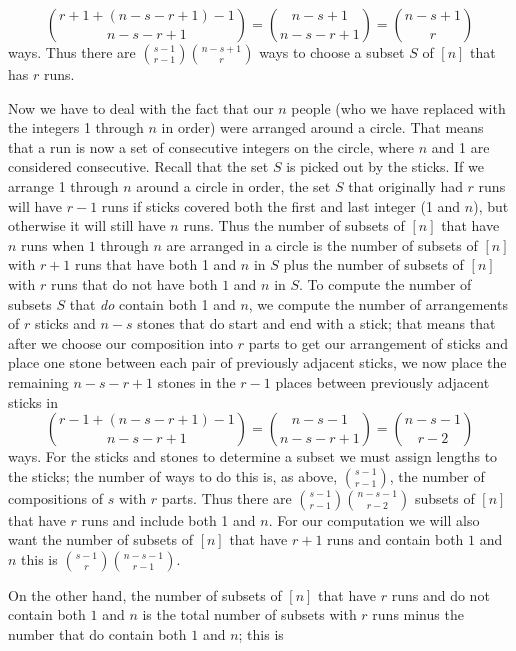 \documentclass[10pt,]{book}
\theoremstyle{plain}
\theoremstyle{definition}
\theoremstyle{definition}
\numberwithin{equation}{chapter}
\begin{document}
\begin{exerciselist}
\begin{equation*}
\binom{r+1 + (n-s-r+1)-1}{n-s-r+1}=\binom{n-s+1}{n-s-r+1}=\binom{n-s+1}{r}
\end{equation*}
ways. Thus there are \(\binom{s-1}{r-1}\binom{n-s+1}{r}\) ways to choose a subset \(S\) of \([n]\) that has \(r\) runs.%
\par
Now we have to deal with the fact that our \(n\) people (who we have replaced with the integers 1 through \(n\) in order) were arranged around a circle. That means that a run is now a set of consecutive integers on the circle, where \(n\) and 1 are considered consecutive. Recall that the set \(S\) is picked out by the sticks. If we arrange 1 through \(n\) around a circle in order, the set \(S\) that originally had \(r\) runs will have \(r-1\) runs if sticks covered both the first and last integer (1 and \(n\)), but otherwise it will still have \(n\) runs. Thus the number of subsets of \([n]\) that have \(n\) runs when \(1\) through \(n\) are arranged in a circle is the number of subsets of \([n]\) with \(r+1\) runs that have both 1 and \(n\) in \(S\) plus the number of subsets of \([n]\) with \(r\) runs that do not have both \(1\) and \(n\) in \(S\). To compute the number of subsets \(S\) that \emph{do} contain both 1 and \(n\), we compute the number of arrangements of \(r\) sticks and \(n-s\) stones that do start and end with a stick; that means that after we choose our composition into \(r\) parts to get our arrangement of sticks and place one stone between each pair of previously adjacent sticks, we now place the remaining \(n-s-r+1\) stones in the \(r-1\) places between previously adjacent sticks in%
\begin{equation*}
\binom{r-1 + (n-s-r+1)-1}{n-s-r+1}=\binom{n-s-1}{n-s-r+1}=\binom{n-s-1}{r-2}
\end{equation*}
ways. For the sticks and stones to determine a subset we must assign lengths to the sticks; the number of ways to do this is, as above, \(\binom{s-1}{r-1}\), the number of compositions of \(s\) with \(r\) parts. Thus there are \(\binom{s-1}{r-1}\binom{n-s-1}{r-2}\) subsets of \([n]\) that have \(r\) runs and include both 1 and \(n\). For our computation we will also want the number of subsets of \([n]\) that have \(r+1\) runs and contain both \(1\) and \(n\) this is \(\binom{s-1}{r}\binom{n-s-1}{r-1}\).%
\par
On the other hand, the number of subsets of \([n]\) that have \(r\) runs and do not contain both \(1\) and \(n\) is the total number of subsets with \(r\) runs minus the number that do contain both \(1\) and \(n\); this is%

\end{exerciselist}
\end{document}
